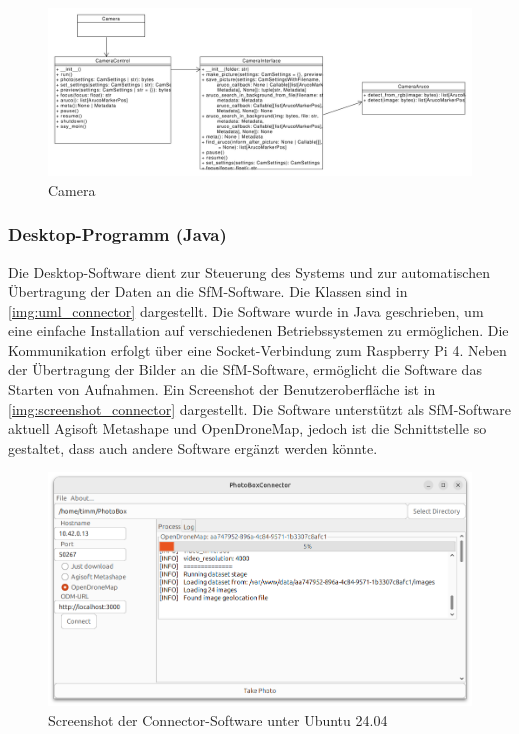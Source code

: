 \documentclass[./00PhotoBox.tex]{subfiles}
\begin{document}
\begin{figure}
    \centering
    \includegraphics[width=1\textwidth]{./img/uml/uml_camera_classdiagramm.pdf}
    \caption{Camera} %
    \label{img:uml_camera} %
\end{figure}


\subsubsection{Desktop-Programm (Java)}
Die Desktop-Software dient zur Steuerung des Systems und zur automatischen Übertragung der Daten an die \gls{SfM}-Software. Die Klassen sind in \autoref{img:uml_connector} dargestellt. Die Software wurde in Java geschrieben, um eine einfache Installation auf verschiedenen Betriebssystemen zu ermöglichen. Die Kommunikation erfolgt über eine Socket-Verbindung zum Raspberry Pi 4. Neben der Übertragung der Bilder an die \gls{SfM}-Software, ermöglicht die Software das Starten von Aufnahmen. Ein Screenshot der Benutzeroberfläche ist in \autoref{img:screenshot_connector} dargestellt. Die Software unterstützt als \gls{SfM}-Software aktuell Agisoft Metashape und OpenDroneMap, jedoch ist die Schnittstelle so gestaltet, dass auch andere Software ergänzt werden könnte.


\begin{figure}
    \centering
    \includegraphics[width=1\textwidth]{./img/connector_screenshot.png}
    \caption{Screenshot der Connector-Software unter Ubuntu 24.04} %
    \label{img:screenshot_connector} %
\end{figure}
\end{document}
